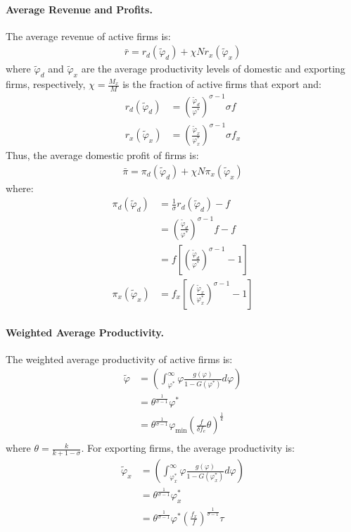 \begin{solution}
	\paragraph{Average Revenue and Profits.} The average revenue of active firms is:
	\begin{align*}
		\bar{r} = r_d(\tilde{\varphi}_d) + \chi N r_x(\tilde{\varphi}_x)
	\end{align*}
	where $\tilde{\varphi}_d$ and $\tilde{\varphi}_x$ are the average productivity levels of domestic and exporting firms, respectively,  $\chi = \frac{M_x}{M}$ is the fraction of active firms that export and:
	\begin{align*}
		r_d(\tilde{\varphi}_d) &= \left(\frac{\tilde{\varphi}_d}{\varphi^*}\right)^{\sigma - 1} \sigma f \\
		r_x(\tilde{\varphi}_x) &= \left(\frac{\tilde{\varphi}_x}{\varphi_x^*}\right)^{\sigma - 1} \sigma f_x
	\end{align*}
	Thus, the average domestic profit of firms is:
	\begin{align*}
		\bar{\pi} = \pi_d(\tilde{\varphi}_d) + \chi N \pi_x(\tilde{\varphi}_x)
	\end{align*}
	where:
	\begin{align*}
		\pi_d(\tilde{\varphi}_d) &= \frac{1}{\sigma} r_d(\tilde{\varphi}_d) - f \\
		&= \left(\frac{\tilde{\varphi}_d}{\varphi^*}\right)^{\sigma - 1} f - f \\
		&= f \left[ \left(\frac{\tilde{\varphi}_d}{\varphi^*}\right)^{\sigma - 1} - 1 \right] \\
		\pi_x(\tilde{\varphi}_x) &= f_x \left[ \left(\frac{\tilde{\varphi}_x}{\varphi_x^*}\right)^{\sigma - 1} - 1 \right]
	\end{align*}

	\paragraph{Weighted Average Productivity.} The weighted average productivity of active firms is:
	\begin{align*}
		\tilde{\varphi} &= \left(\int_{\varphi^*}^{\infty} \varphi \frac{g(\varphi)}{1 - G(\varphi^*)} d\varphi \right) \\
		&= \theta^{\frac{1}{\sigma -1}} \varphi^* \\
		&= \theta^{\frac{1}{\sigma -1}} \varphi_{\min} \left( \frac{f}{\delta f_e} \theta \right)^{\frac{1}{k}} \\
	\end{align*}
	where $\theta = \frac{k}{k+1 - \sigma}$. For exporting firms, the average productivity is:
	\begin{align*}
		\tilde{\varphi}_x &= \left(\int_{\varphi_x^*}^{\infty} \varphi \frac{g(\varphi)}{1 - G(\varphi_x^*)} d\varphi \right) \\
		&= \theta^{\frac{1}{\sigma -1}} \varphi_x^* \\
		&= \theta^{\frac{1}{\sigma -1}} \varphi^* \left( \frac{f_x}{f} \right)^{\frac{1}{\sigma - 1}} \tau \\
	\end{align*}


\end{solution}
